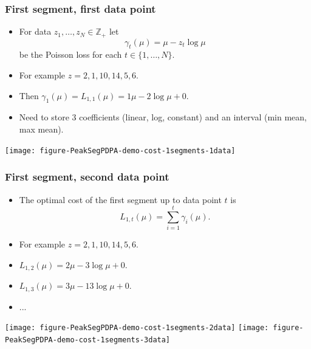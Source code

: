 \documentclass{beamer}
\newcommand{\ZZ}{\mathbb Z}
\begin{document}
\begin{frame}
  \frametitle{First segment, first data point}
  \begin{itemize}
  \item   For data $z_1, \dots, z_N\in\ZZ_+$ let
  \begin{equation*}
    \gamma_t(\mu) = \mu - z_t \log \mu
  \end{equation*}
  be the Poisson loss for each $t\in\{1, \dots, N\}$.
\item For example $z = 2, 1, 10, 14, 5, 6$.
\item Then $\gamma_1(\mu)=L_{1,1}(\mu)= 1\mu - 2\log \mu + 0$.
\item Need to store 3 coefficients (linear, log, constant) and an
  interval (min mean, max mean).
  \end{itemize}
  \begin{center}
    \texttt{[image: figure-PeakSegPDPA-demo-cost-1segments-1data]}
  \end{center}
\end{frame}

\begin{frame}
  \frametitle{First segment, second data point}
  \begin{itemize}
\item
  The optimal cost of the first segment up to data point $t$ is
  \begin{equation*}
    \label{eq:C1b}
    L_{1,t}(\mu) = \sum_{i=1}^t \gamma_i(\mu).
  \end{equation*}
\item For example $z = 2, 1, 10, 14, 5, 6$.
\item $L_{1,2}(\mu) = 2\mu - 3\log\mu + 0$.
\item $L_{1,3}(\mu) = 3\mu - 13\log\mu + 0$.
\item ...
  \end{itemize}
  \begin{center}
    \texttt{[image: figure-PeakSegPDPA-demo-cost-1segments-2data]}
    \texttt{[image: figure-PeakSegPDPA-demo-cost-1segments-3data]}
  \end{center}
\end{frame}
\end{document}
